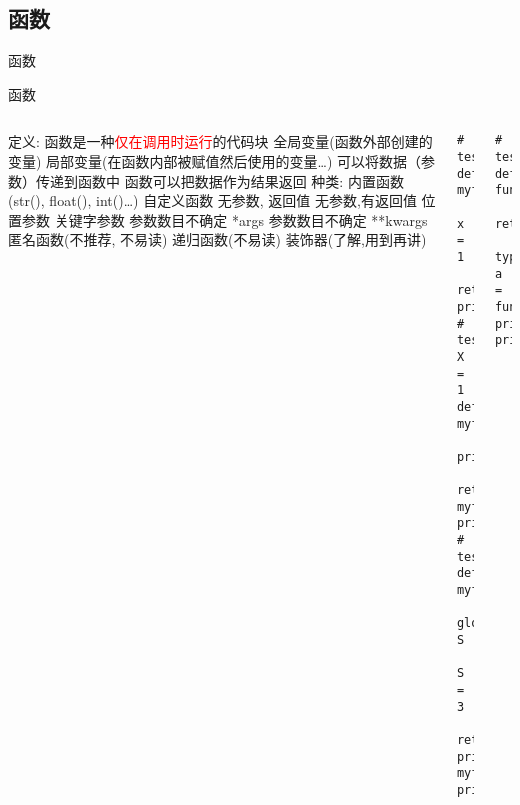 \subsection{函数}
\begin{frame}[standout] 函数 \end{frame}
\begin{frame}[fragile]{函数}
    \begin{columns}
        \begin{myoutline}
            \1 定义:
                \2 函数是一种\textcolor{red}{仅在调用时运行}的代码块
                    \3 全局变量(函数外部创建的变量)
                    \3 局部变量(在函数内部被赋值然后使用的变量\dots)
                \2 可以将数据（参数）传递到函数中
                \2 函数可以把数据作为结果返回
            \1 种类:
                \2 内置函数(str(), float(), int()\dots)
                \2 自定义函数
                    \3 无参数, 返回值
                    \3 无参数,有返回值
                    \3 位置参数
                    \3 关键字参数
                    \3 参数数目不确定 *args
                    \3 参数数目不确定 **kwargs
                \2 匿名函数(不推荐, 不易读)
                \2 递归函数(不易读)
                \2 装饰器(了解,用到再讲)
        \end{myoutline}
        \begin{lstlisting}
# test1
def myfunc():
    x = 1
    return
print(x)
# test2
X = 1
def myfunc2():
    print(X)
    return
myfunc2()
print(X)
# test3
def myfunc3():
    global S
    S = 3
    return
print(S)
myfunc3()
print(S)

        \end{lstlisting}
        \begin{lstlisting}
# test4
def func():
    return

type(func())
a = func()
print(a)
priont(f'{a}')
        \end{lstlisting}
        
    \end{columns}

    
\end{frame}